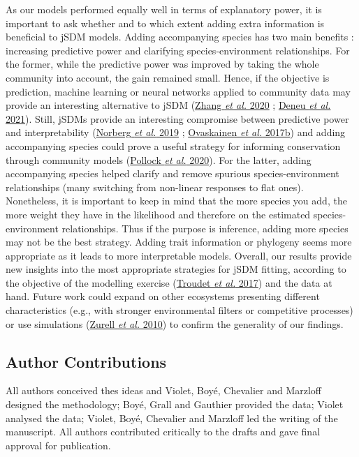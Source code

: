 \documentclass[9pt,biorxiv,doublespacing,lineno,endfloat]{lapreprint}
\begin{document}
As our models performed equally well in terms of explanatory power, it
is important to ask whether and to which extent adding extra information
is beneficial to jSDM models. Adding accompanying species has two main
benefits : increasing predictive power and clarifying
species-environment relationships. For the former, while the predictive
power was improved by taking the whole community into account, the gain
remained small. Hence, if the objective is prediction, machine learning
or neural networks applied to community data may provide an interesting
alternative to jSDM (\protect\hyperlink{ref-Zhang_2020}{Zhang \emph{et
al.} 2020} ; \protect\hyperlink{ref-Deneu_2021}{Deneu \emph{et al.}
2021}). Still, jSDMs provide an interesting compromise between
predictive power and interpretability
(\protect\hyperlink{ref-Norberg_2019}{Norberg \emph{et al.} 2019} ;
\protect\hyperlink{ref-Ovaskainen_2017a}{Ovaskainen \emph{et al.}
2017b}) and adding accompanying species could prove a useful strategy
for informing conservation through community models
(\protect\hyperlink{ref-Pollock_2020}{Pollock \emph{et al.} 2020}). For
the latter, adding accompanying species helped clarify and remove
spurious species-environment relationships (many switching from
non-linear responses to flat ones). Nonetheless, it is important to keep
in mind that the more species you add, the more weight they have in the
likelihood and therefore on the estimated species-environment
relationships. Thus if the purpose is inference, adding more species may
not be the best strategy. Adding trait information or phylogeny seems
more appropriate as it leads to more interpretable models. Overall, our
results provide new insights into the most appropriate strategies for
jSDM fitting, according to the objective of the modelling exercise
(\protect\hyperlink{ref-Troudet_2017}{Troudet \emph{et al.} 2017}) and
the data at hand. Future work could expand on other ecosystems
presenting different characteristics (e.g., with stronger environmental
filters or competitive processes) or use simulations
(\protect\hyperlink{ref-Zurell_2010}{Zurell \emph{et al.} 2010}) to
confirm the generality of our findings.

\hypertarget{author-contributions}{%
\subsection{Author Contributions}\label{author-contributions}}

All authors conceived thes ideas and Violet, Boyé, Chevalier and
Marzloff designed the methodology; Boyé, Grall and Gauthier provided the
data; Violet analysed the data; Violet, Boyé, Chevalier and Marzloff led
the writing of the manuscript. All authors contributed critically to the
drafts and gave final approval for publication.
\end{document}
